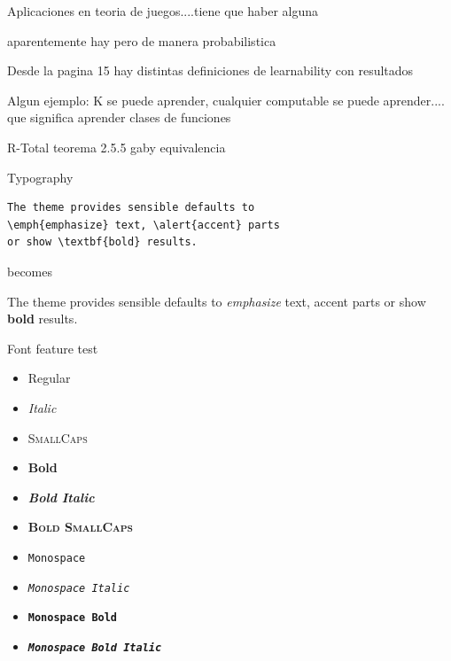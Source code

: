 \documentclass[10pt]{beamer}
\begin{document}
\begin{frame}[fragile]{Aplicaciones en teoria de juegos....tiene que haber alguna}

aparentemente hay pero de manera probabilistica

\end{frame}




\begin{frame}

Desde la pagina 15 hay distintas definiciones de learnability con resultados

Algun ejemplo: K se puede aprender, cualquier computable se puede aprender....
que significa aprender clases de funciones

R-Total teorema 2.5.5 gaby equivalencia 

\end{frame}


\begin{frame}[fragile]{Typography}
      \begin{verbatim}The theme provides sensible defaults to
\emph{emphasize} text, \alert{accent} parts
or show \textbf{bold} results.\end{verbatim}

  \begin{center}becomes\end{center}

  The theme provides sensible defaults to \emph{emphasize} text,
  \alert{accent} parts or show \textbf{bold} results.
\end{frame}

\begin{frame}{Font feature test}
  \begin{itemize}
    \item Regular
    \item \textit{Italic}
    \item \textsc{SmallCaps}
    \item \textbf{Bold}
    \item \textbf{\textit{Bold Italic}}
    \item \textbf{\textsc{Bold SmallCaps}}
    \item \texttt{Monospace}
    \item \texttt{\textit{Monospace Italic}}
    \item \texttt{\textbf{Monospace Bold}}
    \item \texttt{\textbf{\textit{Monospace Bold Italic}}}
  \end{itemize}
\end{frame}
\end{document}
